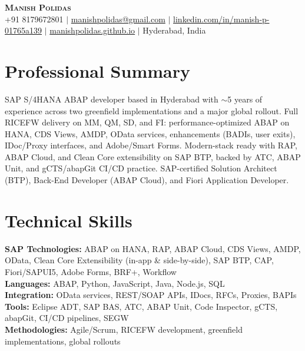 \documentclass[letterpaper,11pt]{article}
\begin{document}
\begin{center}
    \textbf{\Huge \scshape Manish Polidas} \\ \vspace{1pt}
    \small +91 8179672801 $|$ \href{mailto:manishpolidas@gmail.com}{manishpolidas@gmail.com} $|$
    \href{https://www.linkedin.com/in/manish-p-01765a139/}{linkedin.com/in/manish-p-01765a139} $|$
    \href{https://manishpolidas.github.io}{manishpolidas.github.io} $|$ Hyderabad, India
\end{center}

\section{Professional Summary}
SAP S/4HANA ABAP developer based in Hyderabad with $\sim$5 years of experience across two greenfield implementations and a major global rollout. Full RICEFW delivery on MM, QM, SD, and FI: performance-optimized ABAP on HANA, CDS Views, AMDP, OData services, enhancements (BADIs, user exits), IDoc/Proxy interfaces, and Adobe/Smart Forms. Modern-stack ready with RAP, ABAP Cloud, and Clean Core extensibility on SAP BTP, backed by ATC, ABAP Unit, and gCTS/abapGit CI/CD practice. SAP-certified Solution Architect (BTP), Back-End Developer (ABAP Cloud), and Fiori Application Developer.

\section{Technical Skills}
 \begin{itemize}[leftmargin=0.15in, label={}]
    \small{\item{
     \textbf{SAP Technologies:} ABAP on HANA, RAP, ABAP Cloud, CDS Views, AMDP, OData, Clean Core Extensibility (in-app \& side-by-side), SAP BTP, CAP, Fiori/SAPUI5, Adobe Forms, BRF+, Workflow \\
     \textbf{Languages:} ABAP, Python, JavaScript, Java, Node.js, SQL \\
     \textbf{Integration:} OData services, REST/SOAP APIs, IDocs, RFCs, Proxies, BAPIs \\
     \textbf{Tools:} Eclipse ADT, SAP BAS, ATC, ABAP Unit, Code Inspector, gCTS, abapGit, CI/CD pipelines, SEGW \\
     \textbf{Methodologies:} Agile/Scrum, RICEFW development, greenfield implementations, global rollouts \\
    }}
 \end{itemize}
\end{document}
